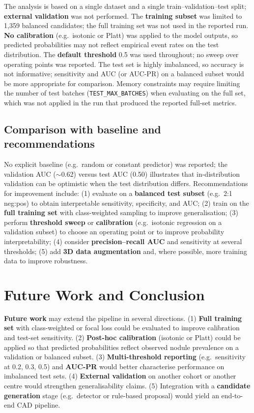 \documentclass[11pt,a4paper]{article}
\begin{document}
The analysis is based on a single dataset and a single train--validation--test split; \textbf{external validation} was not performed. The \textbf{training subset} was limited to 1,359 balanced candidates; the full training set was not used in the reported run. \textbf{No calibration} (e.g.\ isotonic or Platt) was applied to the model outputs, so predicted probabilities may not reflect empirical event rates on the test distribution. The \textbf{default threshold} 0.5 was used throughout; no sweep over operating points was reported. The test set is highly imbalanced, so accuracy is not informative; sensitivity and AUC (or AUC-PR) on a balanced subset would be more appropriate for comparison. Memory constraints may require limiting the number of test batches (\texttt{TEST\_MAX\_BATCHES}) when evaluating on the full set, which was not applied in the run that produced the reported full-set metrics.

\subsection{Comparison with baseline and recommendations}

No explicit baseline (e.g.\ random or constant predictor) was reported; the validation AUC ($\sim$0.62) versus test AUC (0.50) illustrates that in-distribution validation can be optimistic when the test distribution differs. Recommendations for improvement include: (1) evaluate on a \textbf{balanced test subset} (e.g.\ 2:1 neg:pos) to obtain interpretable sensitivity, specificity, and AUC; (2) train on the \textbf{full training set} with class-weighted sampling to improve generalisation; (3) perform \textbf{threshold sweep} or \textbf{calibration} (e.g.\ isotonic regression on a validation subset) to choose an operating point or to improve probability interpretability; (4) consider \textbf{precision--recall AUC} and sensitivity at several thresholds; (5) add \textbf{3D data augmentation} and, where possible, more training data to improve robustness.

\section{Future Work and Conclusion}

\textbf{Future work} may extend the pipeline in several directions. (1) \textbf{Full training set} with class-weighted or focal loss could be evaluated to improve calibration and test-set sensitivity. (2) \textbf{Post-hoc calibration} (isotonic or Platt) could be applied so that predicted probabilities reflect observed nodule prevalence on a validation or balanced subset. (3) \textbf{Multi-threshold reporting} (e.g.\ sensitivity at 0.2, 0.3, 0.5) and \textbf{AUC-PR} would better characterise performance on imbalanced test sets. (4) \textbf{External validation} on another cohort or another centre would strengthen generalisability claims. (5) Integration with a \textbf{candidate generation} stage (e.g.\ detector or rule-based proposal) would yield an end-to-end CAD pipeline.
\end{document}
